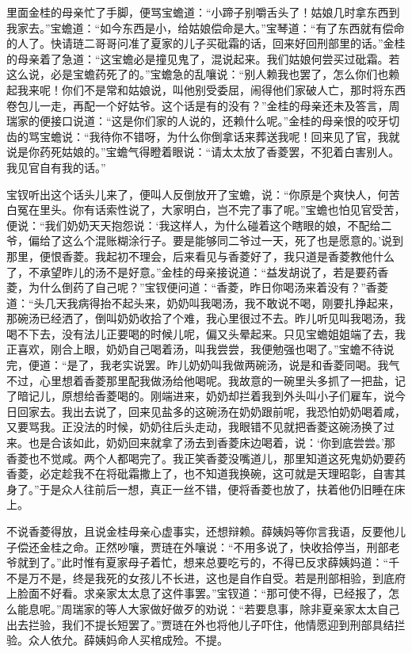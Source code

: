 \begin{parag}
    里面金桂的母亲忙了手脚，便骂宝蟾道：“小蹄子别嚼舌头了！姑娘几时拿东西到我家去。”宝蟾道：“如今东西是小，给姑娘偿命是大。”宝琴道：“有了东西就有偿命的人了。快请琏二哥哥问准了夏家的儿子买砒霜的话，回来好回刑部里的话。”金桂的母亲着了急道：“这宝蟾必是撞见鬼了，混说起来。我们姑娘何尝买过砒霜。若这么说，必是宝蟾药死了的。”宝蟾急的乱嚷说：“别人赖我也罢了，怎么你们也赖起我来呢！你们不是常和姑娘说，叫他别受委屈，闹得他们家破人亡，那时将东西卷包儿一走，再配一个好姑爷。这个话是有的没有？”金桂的母亲还未及答言，周瑞家的便接口说道：“这是你们家的人说的，还赖什么呢。”金桂的母亲恨的咬牙切齿的骂宝蟾说：“我待你不错呀，为什么你倒拿话来葬送我呢！回来见了官，我就说是你药死姑娘的。”宝蟾气得瞪着眼说：“请太太放了香菱罢，不犯着白害别人。我见官自有我的话。”
\end{parag}


\begin{parag}
    宝钗听出这个话头儿来了，便叫人反倒放开了宝蟾，说：“你原是个爽快人，何苦白冤在里头。你有话索性说了，大家明白，岂不完了事了呢。”宝蟾也怕见官受苦，便说：“我们奶奶天天抱怨说：‘我这样人，为什么碰着这个瞎眼的娘，不配给二爷，偏给了这么个混账糊涂行子。要是能够同二爷过一天，死了也是愿意的。’说到那里，便恨香菱。我起初不理会，后来看见与香菱好了，我只道是香菱教他什么了，不承望昨儿的汤不是好意。”金桂的母亲接说道：“益发胡说了，若是要药香菱，为什么倒药了自己呢？”宝钗便问道：“香菱，昨日你喝汤来着没有？”香菱道：“头几天我病得抬不起头来，奶奶叫我喝汤，我不敢说不喝，刚要扎挣起来，那碗汤已经洒了，倒叫奶奶收拾了个难，我心里很过不去。昨儿听见叫我喝汤，我喝不下去，没有法儿正要喝的时候儿呢，偏又头晕起来。只见宝蟾姐姐端了去，我正喜欢，刚合上眼，奶奶自己喝着汤，叫我尝尝，我便勉强也喝了。”宝蟾不待说完，便道：“是了，我老实说罢。昨儿奶奶叫我做两碗汤，说是和香菱同喝。我气不过，心里想着香菱那里配我做汤给他喝呢。我故意的一碗里头多抓了一把盐，记了暗记儿，原想给香菱喝的。刚端进来，奶奶却拦着我到外头叫小子们雇车，说今日回家去。我出去说了，回来见盐多的这碗汤在奶奶跟前呢，我恐怕奶奶喝着咸，又要骂我。正没法的时候，奶奶往后头走动，我眼错不见就把香菱这碗汤换了过来。也是合该如此，奶奶回来就拿了汤去到香菱床边喝着，说：‘你到底尝尝。’那香菱也不觉咸。两个人都喝完了。我正笑香菱没嘴道儿，那里知道这死鬼奶奶要药香菱，必定趁我不在将砒霜撒上了，也不知道我换碗，这可就是天理昭彰，自害其身了。”于是众人往前后一想，真正一丝不错，便将香菱也放了，扶着他仍旧睡在床上。
\end{parag}


\begin{parag}
    不说香菱得放，且说金桂母亲心虚事实，还想辩赖。薛姨妈等你言我语，反要他儿子偿还金桂之命。正然吵嚷，贾琏在外嚷说：“不用多说了，快收拾停当，刑部老爷就到了。”此时惟有夏家母子着忙，想来总要吃亏的，不得已反求薛姨妈道：“千不是万不是，终是我死的女孩儿不长进，这也是自作自受。若是刑部相验，到底府上脸面不好看。求亲家太太息了这件事罢。”宝钗道：“那可使不得，已经报了，怎么能息呢。”周瑞家的等人大家做好做歹的劝说：“若要息事，除非夏亲家太太自己出去拦验，我们不提长短罢了。”贾琏在外也将他儿子吓住，他情愿迎到刑部具结拦验。众人依允。薛姨妈命人买棺成殓。不提。
\end{parag}


